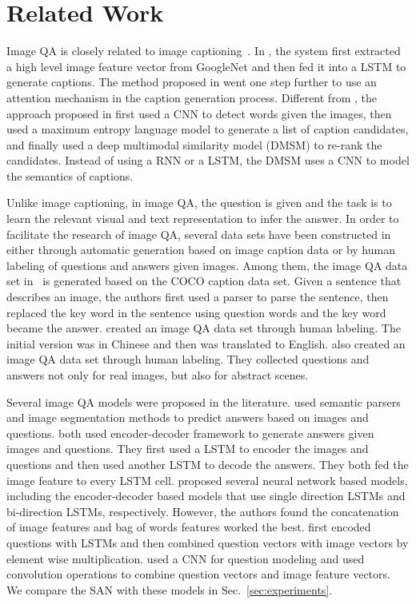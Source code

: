 \documentclass[10pt,twocolumn,letterpaper]{article}
\begin{document}
\vspace{-0.3cm}
\section{Related Work}
Image QA is closely related to image captioning~\cite{chen2014learning,
  xu2015show, fang2014captions, vinyals2014show, kiros2014unifying,
  karpathy2014deep, mao2014deep}. In \cite{vinyals2014show}, the system first
extracted a high level image feature vector from GoogleNet and then fed it into
a LSTM to generate captions. The method proposed in \cite{xu2015show} went one
step further to use an attention mechanism in the caption generation
process. Different from \cite{xu2015show, vinyals2014show}, the approach
proposed in \cite{fang2014captions} first used a CNN to detect words given the
images, then used a maximum entropy language model to generate a list of
caption candidates, and finally used a deep multimodal similarity model (DMSM)
to re-rank the candidates. Instead of using a RNN or a LSTM, the DMSM uses a
CNN to model the semantics of captions.

Unlike image captioning, in image QA, the question is given and the task is to
learn the relevant visual and text representation to infer the answer.  In
order to facilitate the research of image QA, several data sets have been
constructed in~\cite{malinowski2015ask, ren2015imageqa, gao2015you,
  antol2015vqa} either through automatic generation based on image caption data
or by human labeling of questions and answers given images. Among them, the
image QA data set in~\cite{ren2015imageqa} is generated based on the COCO
caption data set. Given a sentence that describes an image, the authors first
used a parser to parse the sentence, then replaced the key word in the sentence
using question words and the key word became the answer. \cite{gao2015you}
created an image QA data set through human labeling. The initial version was in
Chinese and then was translated to English. \cite{antol2015vqa} also created an
image QA data set through human labeling. They collected questions and answers
not only for real images, but also for abstract scenes.

Several image QA models were proposed in the
literature. \cite{malinowski2014multi} used semantic parsers and image
segmentation methods to predict answers based on images and
questions. \cite{malinowski2015ask, gao2015you} both used encoder-decoder
framework to generate answers given images and questions. They first used a
LSTM to encoder the images and questions and then used another LSTM to decode
the answers. They both fed the image feature to every LSTM
cell. \cite{ren2015imageqa} proposed several neural network based models,
including the encoder-decoder based models that use single direction LSTMs and
bi-direction LSTMs, respectively. However, the authors found the concatenation
of image features and bag of words features worked the best.
\cite{antol2015vqa} first encoded questions with LSTMs and then combined
question vectors with image vectors by element wise
multiplication. \cite{ma2015learning} used a CNN for question modeling and used
convolution operations to combine question vectors and image feature
vectors. We compare the SAN with these models in Sec.~\ref{sec:experiments}.
\end{document}
